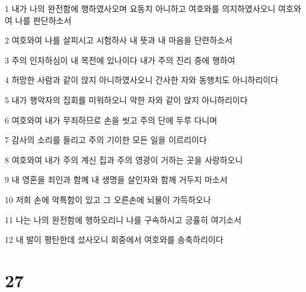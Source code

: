 \par 1 내가 나의 완전함에 행하였사오며 요동치 아니하고 여호와를 의지하였사오니 여호와여 나를 판단하소서
\par 2 여호와여 나를 살피시고 시험하사 내 뜻과 내 마음을 단련하소서
\par 3 주의 인자하심이 내 목전에 있나이다 내가 주의 진리 중에 행하여
\par 4 허망한 사람과 같이 앉지 아니하였사오니 간사한 자와 동행치도 아니하리이다
\par 5 내가 행악자의 집회를 미워하오니 악한 자와 같이 앉지 아니하리이다
\par 6 여호와여 내가 무죄하므로 손을 씻고 주의 단에 두루 다니며
\par 7 감사의 소리를 들리고 주의 기이한 모든 일을 이르리이다
\par 8 여호와여 내가 주의 계신 집과 주의 영광이 거하는 곳을 사랑하오니
\par 9 내 영혼을 죄인과 함께 내 생명을 살인자와 함께 거두지 마소서
\par 10 저희 손에 악특함이 있고 그 오른손에 뇌물이 가득하오나
\par 11 나는 나의 완전함에 행하오리니 나를 구속하시고 긍휼히 여기소서
\par 12 내 발이 평탄한데 섰사오니 회중에서 여호와를 송축하리이다

\chapter{27}


